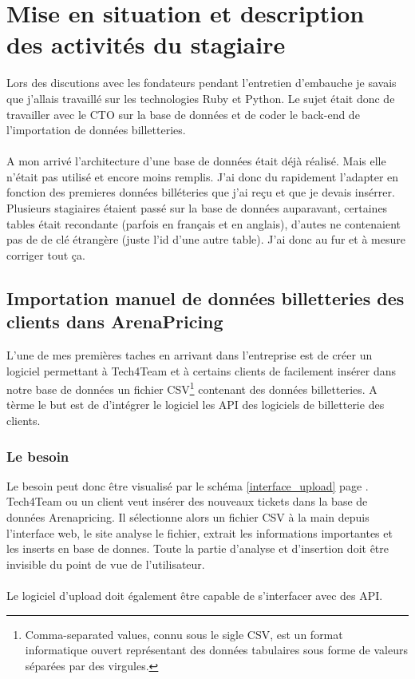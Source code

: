 \chapter{Mise en situation et description des activités du stagiaire}
Lors des discutions avec les fondateurs pendant l'entretien d'embauche je savais que j'allais travaillé sur les technologies Ruby et Python. Le sujet était donc de travailler avec le CTO sur la base de données et de coder le back-end de l'importation de données billetteries.
\\ \\

A mon arrivé l'architecture d'une base de données était déjà réalisé. Mais elle n'était pas utilisé et encore moins remplis. J'ai donc du rapidement l'adapter en fonction des premieres données billéteries que j'ai reçu et que je devais insérrer. Plusieurs stagiaires étaient passé sur la base de données auparavant, certaines tables était recondante (parfois en français et en anglais), d'autes ne contenaient pas de de clé étrangère (juste l'id d'une autre table). J'ai donc au fur et à mesure corriger tout ça. 


\section{Importation manuel de données billetteries des clients dans ArenaPricing}

L'une de mes premières taches en arrivant dans l'entreprise est de créer un logiciel permettant à Tech4Team et à certains clients de facilement insérer dans notre base de données un fichier CSV\footnote{Comma-separated values, connu sous le sigle CSV, est un format informatique ouvert représentant des données tabulaires sous forme de valeurs séparées par des virgules.} contenant des données billetteries. A tèrme le but est de d'intégrer le logiciel les API des logiciels de billetterie des clients.

\subsection{Le besoin}

Le besoin peut donc être visualisé par le schéma \ref{interface_upload} page \pageref{interface_upload}. Tech4Team ou un client veut insérer des nouveaux tickets dans la base de données Arenapricing. Il sélectionne alors un fichier CSV à la main depuis l'interface web, le site analyse le fichier, extrait les informations importantes et les inserts en base de donnes. Toute la partie d'analyse et d'insertion doit être invisible du point de vue de l'utilisateur.
\\ \\
Le logiciel d'upload doit également être capable de s'interfacer avec des API.

